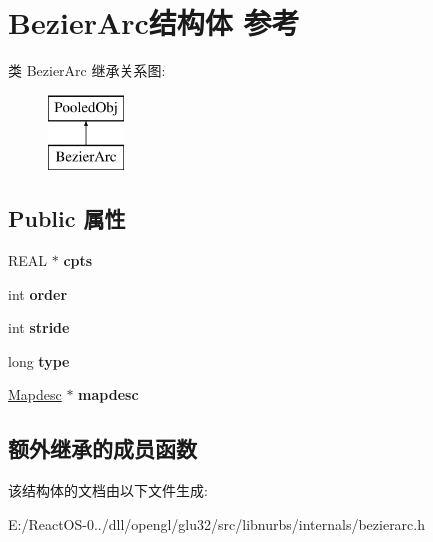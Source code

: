 \hypertarget{struct_bezier_arc}{}\section{Bezier\+Arc结构体 参考}
\label{struct_bezier_arc}
类 Bezier\+Arc 继承关系图\+:\begin{figure}[H]
\begin{center}
\leavevmode
\includegraphics[height=2.000000cm]{struct_bezier_arc}
\end{center}
\end{figure}
\subsection*{Public 属性}
\begin{DoxyCompactItemize}
\item 
\mbox{\label{struct_bezier_arc_a3552f5bc0d3d0eeb4a954b2016d677a6}} 
R\+E\+AL $\ast$ {\bfseries cpts}
\item 
\mbox{\label{struct_bezier_arc_a6039ab9e6561dd07de9f329f367ec451}} 
int {\bfseries order}
\item 
\mbox{\label{struct_bezier_arc_a591e9fdd9f6bfdd2dbbe0e3af441b1be}} 
int {\bfseries stride}
\item 
\mbox{\label{struct_bezier_arc_a22ea27c6022990fae3ab5a0100085c55}} 
long {\bfseries type}
\item 
\mbox{\label{struct_bezier_arc_a01a59eb5c8f6c235c2ace94fb67fc2c3}} 
\hyperlink{class_mapdesc}{Mapdesc} $\ast$ {\bfseries mapdesc}
\end{DoxyCompactItemize}
\subsection*{额外继承的成员函数}


该结构体的文档由以下文件生成\+:\begin{DoxyCompactItemize}
\item 
E\+:/\+React\+O\+S-\/0../dll/opengl/glu32/src/libnurbs/internals/bezierarc.\+h\end{DoxyCompactItemize}
